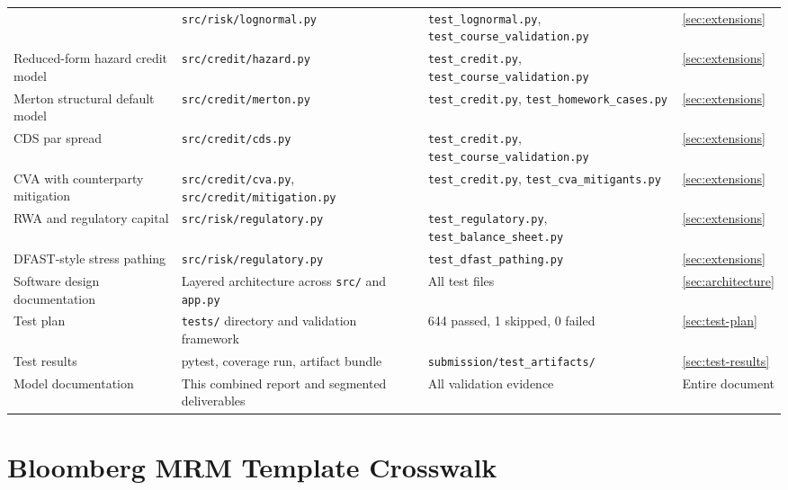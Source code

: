 \documentclass[11pt]{article}
\newcommand{\code}[1]{\texttt{#1}}
\begin{document}
\begin{center}
\begin{longtable}{L{3.0cm}L{4.5cm}L{4.2cm}L{2.0cm}}
  & \code{src/risk/lognormal.py}
  & \code{test\_lognormal.py}, \code{test\_course\_validation.py}
  & \ref{sec:extensions} \\[4pt]
Reduced-form hazard credit model
  & \code{src/credit/hazard.py}
  & \code{test\_credit.py}, \code{test\_course\_validation.py}
  & \ref{sec:extensions} \\[4pt]
Merton structural default model
  & \code{src/credit/merton.py}
  & \code{test\_credit.py}, \code{test\_homework\_cases.py}
  & \ref{sec:extensions} \\[4pt]
CDS par spread
  & \code{src/credit/cds.py}
  & \code{test\_credit.py}, \code{test\_course\_validation.py}
  & \ref{sec:extensions} \\[4pt]
CVA with counterparty mitigation
  & \code{src/credit/cva.py}, \code{src/credit/mitigation.py}
  & \code{test\_credit.py}, \code{test\_cva\_mitigants.py}
  & \ref{sec:extensions} \\[4pt]
RWA and regulatory capital
  & \code{src/risk/regulatory.py}
  & \code{test\_regulatory.py}, \code{test\_balance\_sheet.py}
  & \ref{sec:extensions} \\[4pt]
DFAST-style stress pathing
  & \code{src/risk/regulatory.py}
  & \code{test\_dfast\_pathing.py}
  & \ref{sec:extensions} \\[4pt]
Software design documentation
  & Layered architecture across \code{src/} and \code{app.py}
  & All test files
  & \ref{sec:architecture} \\[4pt]
Test plan
  & \code{tests/} directory and validation framework
  & 644 passed, 1 skipped, 0 failed
  & \ref{sec:test-plan} \\[4pt]
Test results
  & pytest, coverage run, artifact bundle
  & \code{submission/test\_artifacts/}
  & \ref{sec:test-results} \\[4pt]
Model documentation
  & This combined report and segmented deliverables
  & All validation evidence
  & Entire document \\
\bottomrule
\end{longtable}
\end{center}

\section{Bloomberg MRM Template Crosswalk}
\label{sec:mrm-crosswalk}
\end{document}
